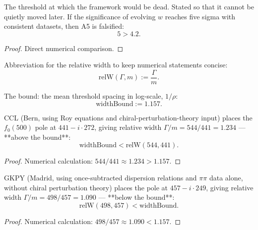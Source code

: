 \begin{theorem}
The threshold at which the framework would be dead.  Stated so that it cannot be quietly moved later.  If the significance of evolving $w$ reaches five sigma with consistent datasets, then A5 is falsified:
\begin{equation}
5 > 4.2.
\end{equation}
\begin{proof}
Direct numerical comparison.
\end{proof}
\end{theorem}

\begin{definition}
Abbreviation for the relative width to keep numerical statements concise:
\begin{equation}
\text{relW}(\Gamma, m) := \frac{\Gamma}{m}.
\end{equation}
\end{definition}

\begin{definition}
The bound: the mean threshold spacing in log-scale, $1/\rho$:
\begin{equation}
\text{widthBound} := 1.157.
\end{equation}
\end{definition}

\begin{theorem}
CCL (Bern, using Roy equations and chiral-perturbation-theory input) places the $f_0(500)$ pole at $441 - i \cdot 272$, giving relative width $\Gamma/m = 544/441 = 1.234$ — **above the bound**:
\begin{equation}
\text{widthBound} < \text{relW}(544, 441).
\end{equation}
\begin{proof}
Numerical calculation: $544/441 \approx 1.234 > 1.157$.
\end{proof}
\end{theorem}

\begin{theorem}
GKPY (Madrid, using once-subtracted dispersion relations and $\pi\pi$ data alone, without chiral perturbation theory) places the pole at $457 - i \cdot 249$, giving relative width $\Gamma/m = 498/457 = 1.090$ — **below the bound**:
\begin{equation}
\text{relW}(498, 457) < \text{widthBound}.
\end{equation}
\begin{proof}
Numerical calculation: $498/457 \approx 1.090 < 1.157$.
\end{proof}
\end{theorem}

